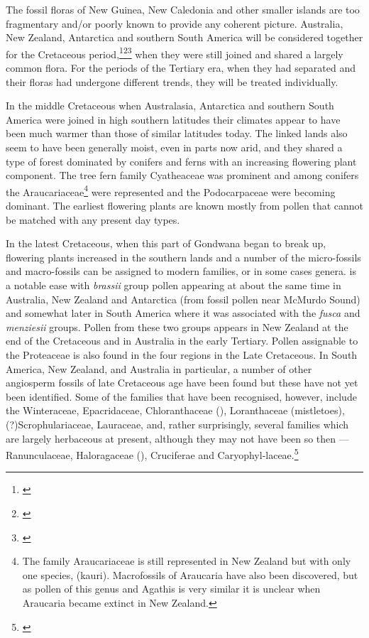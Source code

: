The fossil floras of New Guinea, New Caledonia and other smaller islands are too fragmentary and/or poorly known to provide any coherent picture.
Australia, New Zealand, Antarctica and southern South America will be considered together for the Cretaceous period,\footnote{\cite{mildenhall1980new}}\footnote{\cite{wace1965vascular}}\footnote{\cite{dettmann1981cretaceous}} when they were still joined and shared a largely common flora.
For the periods of the Tertiary era, when they had separated and their floras had undergone different trends, they will be treated individually.

In the middle Cretaceous when Australasia, Antarctica and southern South America were joined in high southern latitudes their climates appear to have been much warmer than those of similar latitudes today.
The linked lands also seem to have been generally moist, even in parts now arid, and they shared a type of forest dominated by conifers and ferns with an increasing flowering plant component.
The tree fern family Cyatheaceae was prominent and among conifers the Araucariaceae\footnote{The family Araucariaceae is still represented in New Zealand but with only one species,  (kauri). Macrofossils of Araucaria have also been discovered, but as pollen of this genus and Agathis is very similar it is unclear when Araucaria became extinct in New Zealand.} were represented and the Podocarpaceae were becoming dominant.
The earliest flowering plants are known mostly from pollen that cannot be matched with any present day types.

In the latest Cretaceous, when this part of Gondwana began to break up, flowering plants increased in the southern lands and a number of the micro-fossils and macro-fossils can be assigned to modern families, or in some cases genera.  is a notable ease with \emph{brassii} group pollen appearing at about the same time in Australia, New Zealand and Antarctica (from fossil pollen near McMurdo Sound) and somewhat later in South America where it was associated with the \emph{fusca} and \emph{menziesii} groups.
Pollen from these two groups appears in New Zealand at the end of the Cretaceous and in Australia in the early Tertiary.
Pollen assignable to the Proteaceae is also found in the four regions in the Late Cretaceous.
In South America, New Zealand, and Australia in particular, a number of other angiosperm fossils of late Cretaceous age have been found but these have not yet been identified.
Some of the families that have been recognised, however, include the Winteraceae, Epacridaceae, Chloranthaceae (), Loranthaceae (mistletoes), (?)Scrophulariaceae, Lauraceae, and, rather surprisingly, several families which are largely herbaceous at present, although they may not have been so then — Ranunculaceae, Haloragaceae (), Cruciferae and Caryophyl-laceae.\footnote{\cite{mildenhall1980new}}

